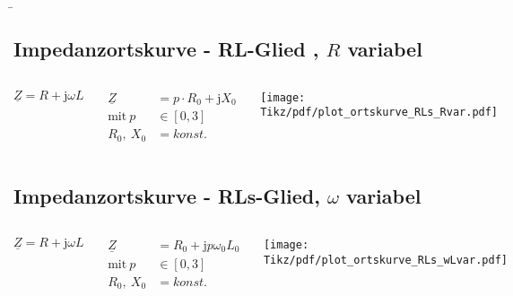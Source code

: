 \b{
\subsection{Impedanzortskurve - RL-Glied , $R$ variabel}
\begin{frame}\ftx{\subsecname}
\begin{columns}
    \centering
    \hfill%
    \begin{equation*}
        \underline{Z}=R+\mathrm{j}\omega L
    \end{equation*}

    \begin{align}
        \underline{Z} &= p \cdot R_0 + \mathrm{j}X_0\\
        \text{mit}\ p &\in [0,3]\\
        R_0,\ X_0 &= konst.
    \end{align}

    \texttt{[image: Tikz/pdf/plot\_ortskurve\_RLs\_Rvar.pdf]}
\end{columns}
\end{frame}

\subsection{Impedanzortskurve - RLs-Glied, $\omega$ variabel}
\begin{frame}\ftx{\subsecname}
\begin{columns}
    \centering
    \hfill%
    \begin{equation*}
        \underline{Z}=R+\mathrm{j}\omega L
    \end{equation*}

    \begin{align}
        \underline{Z} &= R_0 + \mathrm{j}p\omega_0L_0\\ %
        \text{mit}\ p &\in [0,3]\\
        R_0,\ X_0 &= konst.
    \end{align}

    \texttt{[image: Tikz/pdf/plot\_ortskurve\_RLs\_wLvar.pdf]}
\end{columns}
\end{frame}
}%

